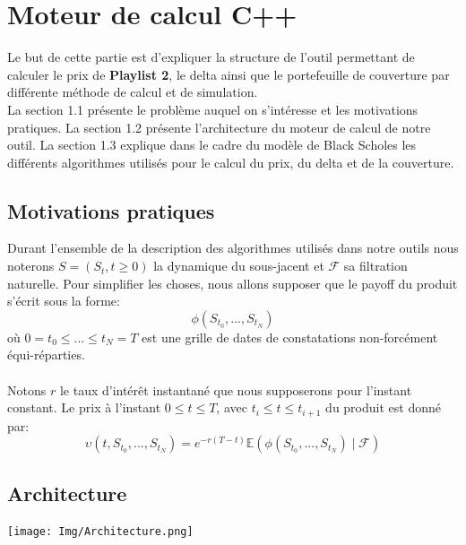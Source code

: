 \documentclass[french,12pt,a4paper]{article}
\begin{document}
\section{Moteur de calcul C++}
Le but de cette partie est d'expliquer la structure de l'outil permettant de calculer le prix de \textbf{Playlist 2}, le delta ainsi que le portefeuille de couverture par différente méthode de calcul et de simulation.\\
La section 1.1 présente le problème auquel on s'intéresse et les motivations pratiques. La section 1.2 présente l'architecture du moteur de calcul de notre outil. La section 1.3 explique dans le cadre du modèle de Black Scholes les différents algorithmes utilisés pour le calcul du prix, du delta et de la couverture.

\subsection{Motivations pratiques}
Durant l'ensemble de la description  des algorithmes utilisés dans notre outils nous noterons $S = (S_{t}, t \geq 0)$ la dynamique du sous-jacent et $\mathcal{F}$ sa filtration naturelle. Pour simplifier les choses, nous allons supposer que le payoff du produit s'écrit sous la forme:
$$\phi(S_{t_{0}},...,S_{t_{N}}) $$
où $0 = t_{0} \leq ... \leq t_{N} = T$ est une grille de dates de constatations non-forcément équi-réparties.\\\\
Notons $r$ le taux d'intérêt instantané que nous supposerons pour l'instant constant. Le prix à l'instant $0 \leq t \leq T$, avec $t_{i} \leq t \leq t_{i+1}$ du produit est donné par:
$$\upsilon(t, S_{t_{0}},...,S_{t_{N}}) = e^{-r(T-t)}\mathbb{E}(\phi(S_{t_{0}},...,S_{t_{N}})\mid\mathcal{F})$$

\subsection{Architecture}

\begin{center}
\texttt{[image: Img/Architecture.png]}
\end{center}
\end{document}
